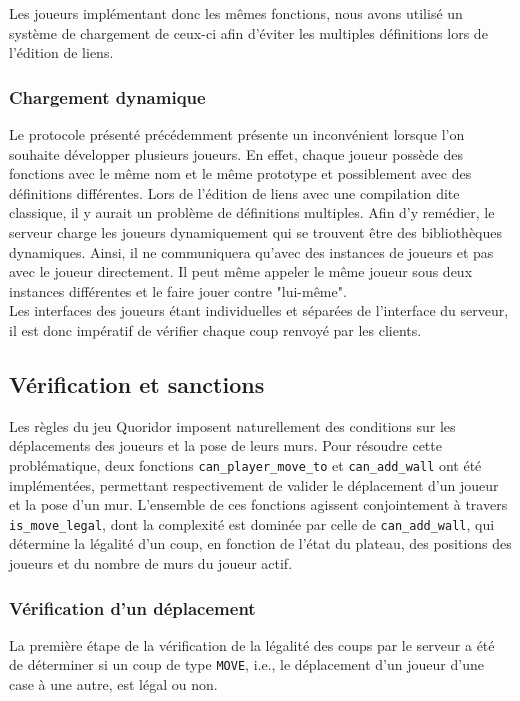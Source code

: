 \documentclass[11pt]{article}
\begin{document}
Les joueurs implémentant donc les mêmes fonctions, nous avons utilisé un système de chargement de ceux-ci afin d'éviter les multiples définitions lors de l'édition de liens.

\subsubsection{Chargement dynamique}

Le protocole présenté précédemment présente un inconvénient lorsque l'on souhaite développer plusieurs joueurs. En effet, chaque joueur possède des fonctions avec le même nom et le même prototype et possiblement avec des définitions différentes. Lors de l'édition de liens avec une compilation dite classique, il y aurait un problème de définitions multiples. Afin d'y remédier, le serveur charge les joueurs dynamiquement qui se trouvent être des bibliothèques dynamiques. Ainsi, il ne communiquera qu'avec des instances de joueurs et pas avec le joueur directement. Il peut même appeler le même joueur sous deux instances différentes et le faire jouer contre "lui-même". \\

Les interfaces des joueurs étant individuelles et séparées de l'interface du serveur, il est donc impératif de vérifier chaque coup renvoyé par les clients.

\subsection{Vérification et sanctions} \label{sec:sanctions}

Les règles du jeu Quoridor imposent naturellement des conditions sur les déplacements des joueurs et la pose de leurs murs. Pour résoudre cette problématique, deux fonctions \texttt{can\_player\_move\_to} et \texttt{can\_add\_wall} ont été implémentées, permettant respectivement de valider le déplacement d'un joueur et la pose d'un mur. L'ensemble de ces fonctions agissent conjointement à travers \texttt{is\_move\_legal}, dont la complexité est dominée par celle de \texttt{can\_add\_wall}, qui détermine la légalité d'un coup, en fonction de l'état du plateau, des positions des joueurs et du nombre de murs du joueur actif.

\subsubsection{Vérification d'un déplacement}

La première étape de la vérification de la légalité des coups par le serveur a été de déterminer si un coup de type \texttt{MOVE}, i.e., le déplacement d'un joueur d'une case à une autre, est légal ou non.
\end{document}

